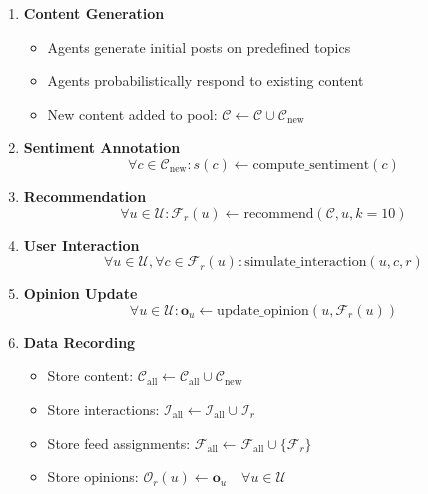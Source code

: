 \documentclass[11pt]{article}
\begin{document}
\begin{enumerate}
    \item \textbf{Content Generation}
    \begin{itemize}
        \item Agents generate initial posts on predefined topics
        \item Agents probabilistically respond to existing content
        \item New content added to pool: $\mathcal{C} \leftarrow \mathcal{C} \cup \mathcal{C}_{\text{new}}$
    \end{itemize}

    \item \textbf{Sentiment Annotation}
    \begin{equation}
    \forall c \in \mathcal{C}_{\text{new}}: s(c) \leftarrow \text{compute\_sentiment}(c)
    \end{equation}

    \item \textbf{Recommendation}
    \begin{equation}
    \forall u \in \mathcal{U}: \mathcal{F}_r(u) \leftarrow \text{recommend}(\mathcal{C}, u, k=10)
    \end{equation}

    \item \textbf{User Interaction}
    \begin{equation}
    \forall u \in \mathcal{U}, \forall c \in \mathcal{F}_r(u): \text{simulate\_interaction}(u, c, r)
    \end{equation}

    \item \textbf{Opinion Update}
    \begin{equation}
    \forall u \in \mathcal{U}: \mathbf{o}_u \leftarrow \text{update\_opinion}(u, \mathcal{F}_r(u))
    \end{equation}

    \item \textbf{Data Recording}
    \begin{itemize}
        \item Store content: $\mathcal{C}_{\text{all}} \leftarrow \mathcal{C}_{\text{all}} \cup \mathcal{C}_{\text{new}}$
        \item Store interactions: $\mathcal{I}_{\text{all}} \leftarrow \mathcal{I}_{\text{all}} \cup \mathcal{I}_r$
        \item Store feed assignments: $\mathcal{F}_{\text{all}} \leftarrow \mathcal{F}_{\text{all}} \cup \{\mathcal{F}_r\}$
        \item Store opinions: $\mathcal{O}_r(u) \leftarrow \mathbf{o}_u \quad \forall u \in \mathcal{U}$
    \end{itemize}
\end{enumerate}
\end{document}
